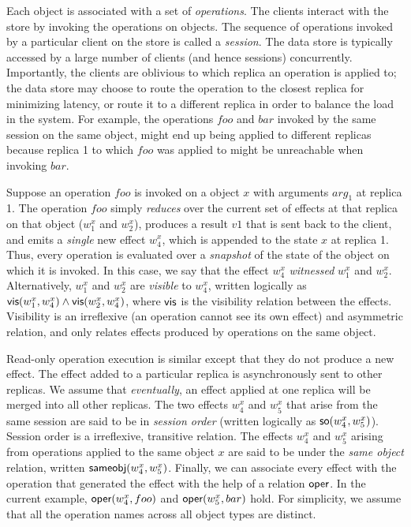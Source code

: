 Each object is associated with a set of \emph{operations}. The clients interact
with the store by invoking the operations on objects. The sequence of operations
invoked by a particular client on the store is called a \emph{session}. The
data store is typically accessed by a large number of clients (and hence
sessions) concurrently. Importantly, the clients are oblivious to which replica
an operation is applied to; the data store may choose to route the operation to
the closest replica for minimizing latency, or route it to a different replica
in order to balance the load in the system. For example, the operations $foo$
and $bar$ invoked by the same session on the same object, might end up being
applied to different replicas because replica 1 to which $foo$ was applied to
might be unreachable when invoking $bar$.

Suppose an operation $foo$ is invoked on a object $x$ with arguments $arg_1$ at
replica 1. The operation $foo$ simply \emph{reduces} over the current set of
effects at that replica on that object ($w^x_1$ and $w^x_2$), produces a result
$v1$ that is sent back to the client, and emits a \emph{single} new effect
$w^x_4$, which is appended to the state $x$ at replica 1. Thus, every operation
is evaluated over a \emph{snapshot} of the state of the object on which it is
invoked. In this case, we say that the effect $w^x_4$ \emph{witnessed} $w^x_1$
and $w^x_2$. Alternatively, $w^x_1$ and $w^x_2$ are \emph{visible} to $w^x_4$,
written logically as ${\normalfont \textsf{vis}(w^x_1,w^x_4)} \wedge {\normalfont \textsf{vis}(w^x_2,w^x_4)}$, where
${\normalfont \textsf{vis}}$ is the visibility relation between the effects. Visibility is an
irreflexive (an operation cannot see its own effect) and asymmetric relation,
and only relates effects produced by operations on the same object.

Read-only operation execution is similar except that they do not produce a new
effect. The effect added to a particular replica is asynchronously sent to
other replicas. We assume that \emph{eventually}, an effect applied at one
replica will be merged into all other replicas. The two effects $w^x_4$ and
$w^x_5$ that arise from the same session are said to be in \emph{session order}
(written logically as ${\normalfont \textsf{so}(w^x_4,w^x_5)}$). Session order is a irreflexive,
transitive relation. The effects $w^x_4$ and $w^x_5$ arising from operations
applied to the same object $x$ are said to be under the \emph{same object}
relation, written ${\normalfont \textsf{sameobj}(w^x_4,w^x_5)}$. Finally, we can associate every
effect with the operation that generated the effect with the help of a relation
${\normalfont \textsf{oper}}$. In the current example, ${\normalfont \textsf{oper}(w^x_4,foo)}$ and ${\normalfont \textsf{oper}(w^x_5,bar)}$
hold. For simplicity, we assume that all the operation names across all object
types are distinct.


